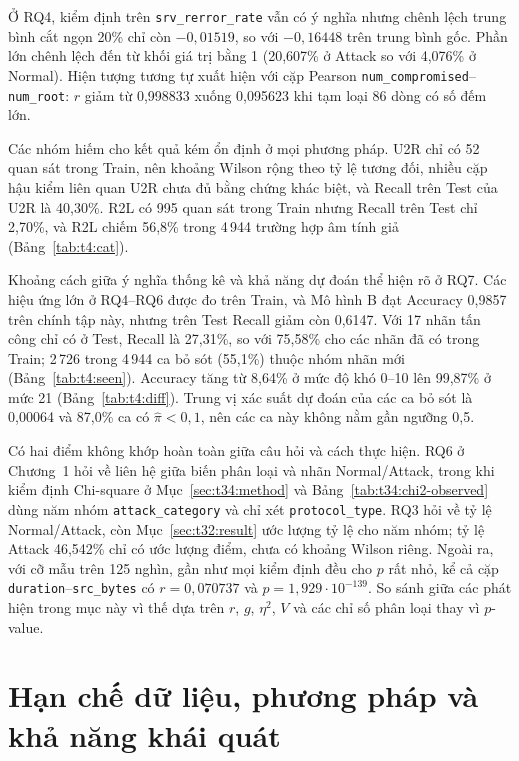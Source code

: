 \documentclass[../main.tex]{subfiles}
\begin{document}
Ở RQ4, kiểm định trên \texttt{srv\_rerror\_rate} vẫn có ý nghĩa nhưng chênh lệch trung bình cắt ngọn 20\% chỉ còn $-0{,}01519$, so với $-0{,}16448$ trên trung bình gốc. Phần lớn chênh lệch đến từ khối giá trị bằng 1 (20,607\% ở Attack so với 4,076\% ở Normal). Hiện tượng tương tự xuất hiện với cặp Pearson \texttt{num\_compromised}--\texttt{num\_root}: $r$ giảm từ 0,998833 xuống 0,095623 khi tạm loại 86 dòng có số đếm lớn.

Các nhóm hiếm cho kết quả kém ổn định ở mọi phương pháp. U2R chỉ có 52 quan sát trong Train, nên khoảng Wilson rộng theo tỷ lệ tương đối, nhiều cặp hậu kiểm liên quan U2R chưa đủ bằng chứng khác biệt, và Recall trên Test của U2R là 40,30\%. R2L có 995 quan sát trong Train nhưng Recall trên Test chỉ 2,70\%, và R2L chiếm 56,8\% trong 4\,944 trường hợp âm tính giả (Bảng~\ref{tab:t4:cat}).

Khoảng cách giữa ý nghĩa thống kê và khả năng dự đoán thể hiện rõ ở RQ7. Các hiệu ứng lớn ở RQ4--RQ6 được đo trên Train, và Mô hình B đạt Accuracy 0,9857 trên chính tập này, nhưng trên Test Recall giảm còn 0,6147. Với 17 nhãn tấn công chỉ có ở Test, Recall là 27,31\%, so với 75,58\% cho các nhãn đã có trong Train; 2\,726 trong 4\,944 ca bỏ sót (55,1\%) thuộc nhóm nhãn mới (Bảng~\ref{tab:t4:seen}). Accuracy tăng từ 8,64\% ở mức độ khó 0--10 lên 99,87\% ở mức 21 (Bảng~\ref{tab:t4:diff}). Trung vị xác suất dự đoán của các ca bỏ sót là 0,00064 và 87,0\% ca có $\hat\pi<0{,}1$, nên các ca này không nằm gần ngưỡng 0,5.

Có hai điểm không khớp hoàn toàn giữa câu hỏi và cách thực hiện. RQ6 ở Chương~1 hỏi về liên hệ giữa biến phân loại và nhãn Normal/Attack, trong khi kiểm định Chi-square ở Mục~\ref{sec:t34:method} và Bảng~\ref{tab:t34:chi2-observed} dùng năm nhóm \texttt{attack\_category} và chỉ xét \texttt{protocol\_type}. RQ3 hỏi về tỷ lệ Normal/Attack, còn Mục~\ref{sec:t32:result} ước lượng tỷ lệ cho năm nhóm; tỷ lệ Attack 46,542\% chỉ có ước lượng điểm, chưa có khoảng Wilson riêng. Ngoài ra, với cỡ mẫu trên 125 nghìn, gần như mọi kiểm định đều cho $p$ rất nhỏ, kể cả cặp \texttt{duration}--\texttt{src\_bytes} có $r=0{,}070737$ và $p=1{,}929\cdot10^{-139}$. So sánh giữa các phát hiện trong mục này vì thế dựa trên $r$, $g$, $\eta^2$, $V$ và các chỉ số phân loại thay vì $p$-value.

\section{Hạn chế dữ liệu, phương pháp và khả năng khái quát}
\label{sec:t5:limits}
\end{document}
